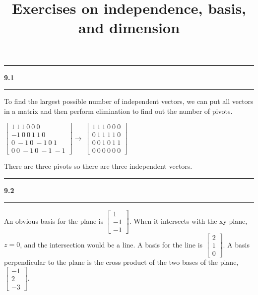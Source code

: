 \documentclass[11pt]{article}
\newcommand\question[2]{\vspace{.25in}\hrule\textbf{#1 #2}\vspace{.5em}\hrule\vspace{.10in}}
\begin{document}
\raggedright
\newcommand\NAME{Haiying Cui}  %
\newcommand\ANDREWID{Christy}     %
\newcommand\HWNUM{9}              %

\title{Exercises on independence, basis, and dimension}
\maketitle

\question{9.1}{}
To find the largest possible number of independent vectors, we can put all vectors in a matrix and then perform elimination to find out the number of pivots.

\(\begin{bmatrix} 1 \ 1 \ 1 \ 0 \ 0 \ 0 \\ -1 \ 0 \ 0 \ 1 \ 1 \ 0 \\ 0 \ -1 \ 0 \ -1 \ 0 \ 1 \\ 0 \ 0 \ -1 \ 0 \ -1 \ -1 \end{bmatrix}\to\,\begin{bmatrix} 1 \ 1 \ 1 \ 0 \ 0 \ 0 \\ 0 \ 1 \ 1 \ 1 \ 1 \ 0 \\ 0 \ 0 \ 1 \ 0 \ 1 \ 1 \\ 0 \ 0 \ 0 \ 0 \ 0 \ 0 \end{bmatrix}\)

There are three pivots so there are three independent vectors.

\question{9.2}{}
An obvious basis for the plane is \(\begin{bmatrix} 1 \\ -1 \\ -1 \end{bmatrix}\). When it intersects with the xy plane, \(z = 0\), and the intersection would be a line. A basis for the line is \(\begin{bmatrix} 2 \\ 1 \\ 0 \end{bmatrix}\). A basis perpendicular to the plane is the cross product of the two bases of the plane, \(\begin{bmatrix} -1 \\ 2 \\ -3 \end{bmatrix}\).  
\end{document}
